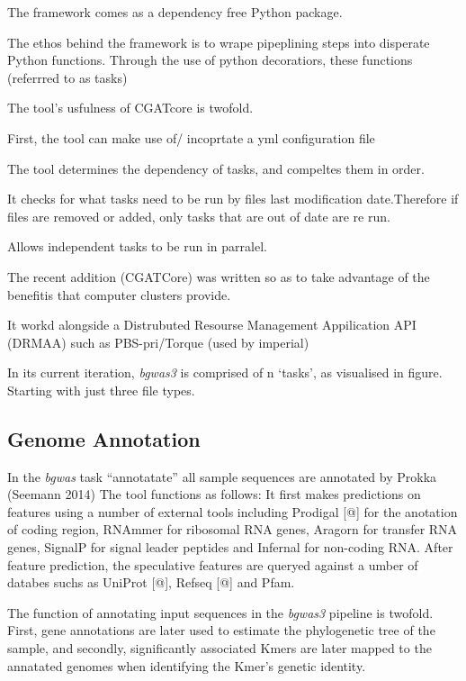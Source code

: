 \documentclass[]{DissertateUSU}
\begin{document}
The framework comes as a dependency free Python package.

The ethos behind the framework is to wrape pipeplining steps into
disperate Python functions. Through the use of python decoratiors, these
functions (referrred to as tasks)

The tool's usfulness of CGATcore is twofold.

First, the tool can make use of/ incoprtate a yml configuration file

The tool determines the dependency of tasks, and compeltes them in
order.

It checks for what tasks need to be run by files last modification
date.Therefore if files are removed or added, only tasks that are out of
date are re run.

Allows independent tasks to be run in parralel.

The recent addition (CGATCore) was written so as to take advantage of
the benefitis that computer clusters provide.

It workd alongside a Distrubuted Resourse Management Appilication API
(DRMAA) such as PBS-pri/Torque (used by imperial)

In its current iteration, \emph{bgwas3} is comprised of n `tasks', as
visualised in figure. Starting with just three file types.

\hypertarget{genome-annotation}{%
\subsection{Genome Annotation}\label{genome-annotation}}

In the \emph{bgwas} task ``annotatate'' all sample sequences are
annotated by Prokka (Seemann 2014) The tool functions as follows: It
first makes predictions on features using a number of external tools
including Prodigal {[}@{]} for the anotation of coding region, RNAmmer
for ribosomal RNA genes, Aragorn for transfer RNA genes, SignalP for
signal leader peptides and Infernal for non-coding RNA. After feature
prediction, the speculative features are queryed against a umber of
databes suchs as UniProt {[}@{]}, Refseq {[}@{]} and Pfam.

The function of annotating input sequences in the \emph{bgwas3} pipeline
is twofold. First, gene annotations are later used to estimate the
phylogenetic tree of the sample, and secondly, significantly associated
Kmers are later mapped to the annatated genomes when identifying the
Kmer's genetic identity.
\end{document}
